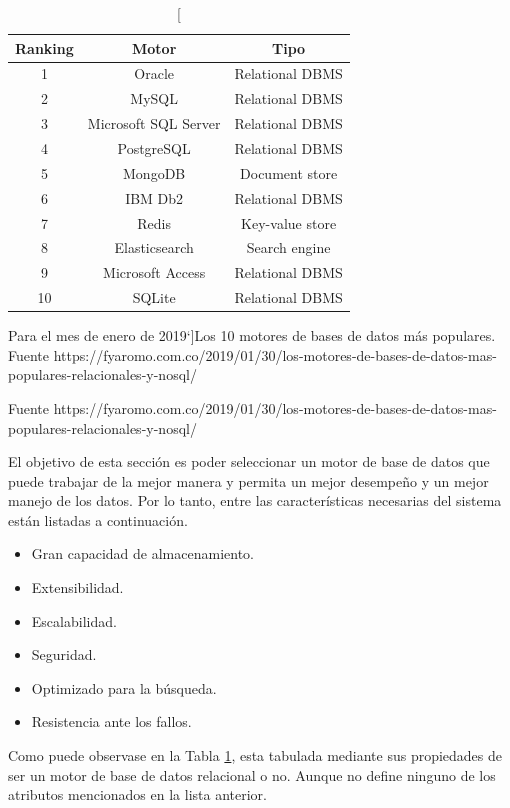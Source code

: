 \begin{table}[htdp]
\centering
\begin{tabular}{||c | c | c ||}
\hline
\hline
\textbf{Ranking} & \textbf{Motor} & \textbf{Tipo} \\
\hline
\hline
1 & Oracle & Relational DBMS \\
\hline
\hline
2 & MySQL & Relational DBMS \\
\hline
\hline
3 & Microsoft SQL Server & Relational DBMS \\
\hline
\hline
4 & PostgreSQL & Relational DBMS \\
\hline
\hline
5 & MongoDB & Document store \\
\hline
\hline
6 & IBM Db2 & Relational DBMS \\
\hline
\hline
7 & Redis & Key-value store \\
\hline
\hline
8 & Elasticsearch & Search engine \\
\hline
\hline
9 & Microsoft Access & Relational DBMS \\
\hline
\hline
10 & SQLite & Relational DBMS \\
\hline
\hline
\end{tabular}
\caption[Para el mes de enero de 2019`]{Los 10 motores de bases de datos más populares. \\ Fuente https://fyaromo.com.co/2019/01/30/los-motores-de-bases-de-datos-mas-populares-relacionales-y-nosql/}
\label{tab:tabla-db-list} 
\end{table}
Fuente https://fyaromo.com.co/2019/01/30/los-motores-de-bases-de-datos-mas-populares-relacionales-y-nosql/

El objetivo de esta sección es poder seleccionar un motor de base de datos que puede trabajar de la mejor manera y permita un mejor desempeño y un mejor manejo de los datos. Por lo tanto, entre las características necesarias del sistema están listadas a continuación.

\begin{itemize}
\item Gran capacidad de almacenamiento.
\item Extensibilidad.
\item Escalabilidad.
\item Seguridad.
\item Optimizado para la búsqueda.
\item Resistencia ante los fallos.
\end{itemize}

Como puede observase en la Tabla \ref{tab:tabla-db-list}, esta tabulada mediante sus propiedades de ser un motor de base de datos relacional o no. Aunque no define ninguno de los atributos mencionados en la lista anterior. 

